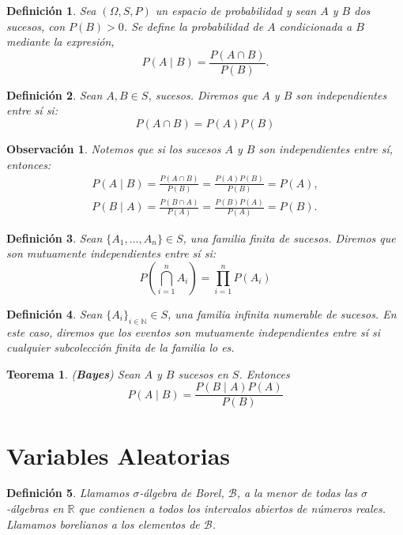 \documentclass{report}
\newtheorem{thm}{Teorema}[section]
\newtheorem{dfn}{Definición}[section]
\newtheorem{obs}{Observación}[section]
\begin{document}
\begin{dfn}
Sea \( (\Omega, S, P) \) un espacio de probabilidad y sean \( A \) y \( B \) dos sucesos, con \( P(B) > 0 \). 
Se define la probabilidad de \( A \) condicionada a \( B \) mediante la expresión,
\[
P(A \mid B) = \frac{P(A \cap B)}{P(B)}.
\]
\end{dfn}

\begin{dfn}
Sean $A, B\in S$, sucesos. Diremos que $A$ y $B$ son \emph{independientes} entre sí si:
$$
P(A\cap B) = P(A)P(B)
$$
\end{dfn}

\begin{obs}
    Notemos que si los sucesos $A$ y $B$ son independientes entre sí, entonces:
    \[
    \begin{split}
        P(A \mid B) =  \frac{P(A \cap B)}{P(B)} =\frac{P(A)P(B)}{P(B)} = P(A),\\
        P(B \mid A) =  \frac{P(B \cap A)}{P(A)} =\frac{P(B)P(A)}{P(A)} = P(B).
    \end{split}
    \]
\end{obs}

\begin{dfn}
Sean $\{A_1, \ldots, A_n\}\in S$, una familia finita de sucesos. Diremos que son \emph{mutuamente independientes} entre sí si:
$$
P\left(\bigcap_{i=1}^n A_i \right) = \prod_{i=1}^{n} P(A_i)
$$
\end{dfn}

\begin{dfn}
Sean $\{A_i\}_{i\in\mathbb{N}}\in S$, una familia infinita numerable de sucesos. En este caso, diremos que los eventos son mutuamente
independientes entre sí si cualquier subcolección finita de la familia lo es.
\end{dfn}

\begin{thm}(\textbf{Bayes})
Sean $A$ y $B$ sucesos en $S$. Entonces
\begin{equation*}
    P(A\mid B) = \frac{P(B\mid A)P(A)}{P(B)}
\end{equation*}
\end{thm}

\section{Variables Aleatorias}

\begin{dfn}
    Llamamos $\sigma$-álgebra de Borel, $\mathcal{B}$, a la menor de todas las $\sigma$-álgebras en $\mathbb{R}$ que contienen a todos los intervalos
    abiertos de números reales. Llamamos \emph{borelianos} a los elementos de $\mathcal{B}$. 
\end{dfn}
\end{document}
